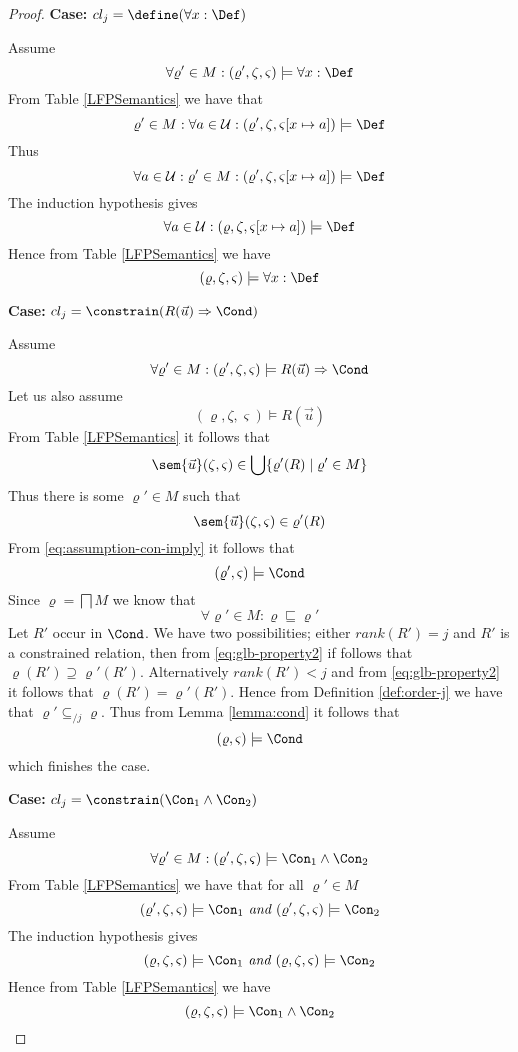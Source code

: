 \begin{proof}
\noindent\textbf{Case: }$cl_j=\define(\forall x: \Def)$

\noindent Assume
\begin{equation}
  \forall \varrho' \in M: (\varrho',\zeta,\varsigma) \models \forall x: \Def
\end{equation}
From Table \ref{LFPSemantics} we have that
$$
\varrho' \in M: \forall a \in \mathcal{U}: (\varrho',\zeta,\varsigma[x
\mapsto a]) \models \Def
$$
Thus
$$
\forall a \in \mathcal{U}: \varrho' \in M: (\varrho',\zeta,\varsigma[x
\mapsto a]) \models \Def
$$
The induction hypothesis gives
$$
\forall a \in \mathcal{U}: (\varrho,\zeta,\varsigma[x
\mapsto a]) \models \Def
$$
Hence from Table \ref{LFPSemantics} we have
$$
 (\varrho,\zeta,\varsigma) \models \forall x: \Def
$$

\noindent\textbf{Case: }$cl_j=\constrain(R(\vec u) \Rightarrow \Cond)$

\noindent Assume
\begin{equation}
  \forall \varrho' \in M: (\varrho',\zeta,\varsigma) \models R(\vec u) 
  \Rightarrow \Cond \label{eq:assumption-con-imply}
\end{equation}
Let us also assume
$$
(\varrho,\zeta,\varsigma) \models R(\vec u)
$$
From Table \ref{LFPSemantics} it follows that
$$
\sem{\vec u}(\zeta, \varsigma) \in \bigcup \{ \varrho'(R) \mid \varrho' \in M \}
$$
Thus there is some $\varrho' \in M$ such that
$$
\sem{\vec u}(\zeta, \varsigma) \in \varrho'(R)
$$
From \eqref{eq:assumption-con-imply} it follows that
$$
(\varrho',\varsigma) \models \Cond
$$
Since $\varrho=\bigsqcap M$ we know that
\begin{equation}
\forall \varrho' \in M: \varrho \sqsubseteq \varrho' \label{eq:glb-property2}
\end{equation}
Let $R'$ occur in $\Cond$. We have two possibilities; either
$rank(R')=j$ and $R'$ is a constrained relation, then from
\eqref{eq:glb-property2} if follows that $\varrho(R') \supseteq
\varrho'(R')$. Alternatively $rank(R')<j$ and from
\eqref{eq:glb-property2} it follows that $\varrho(R') =
\varrho'(R')$. Hence from Definition \ref{def:order-j} we have that
$\varrho' \subseteq_{/j} \varrho$. Thus from Lemma \ref{lemma:cond} it
follows that
$$
(\varrho,\varsigma) \models \Cond
$$
which finishes the case.

\noindent\textbf{Case: }$cl_j=\constrain(\Con_1 \wedge \Con_2)$

\noindent Assume
$$
  \forall \varrho' \in M: (\varrho',\zeta,\varsigma) \models \Con_1 \wedge \Con_2
$$
From Table \ref{LFPSemantics} we have that for all $\varrho' \in M$
$$
(\varrho',\zeta,\varsigma) \models \Con_1 \textit{ and } (\varrho',\zeta,\varsigma)
\models \Con_2
$$
The induction hypothesis gives
$$
(\varrho,\zeta,\varsigma) \models \Con_1 \textit{ and } (\varrho,\zeta,\varsigma)
\models \Con_2
$$
Hence from Table \ref{LFPSemantics} we have
$$
(\varrho,\zeta,\varsigma) \models \Con_1 \wedge \Con_2
$$


\end{proof}

